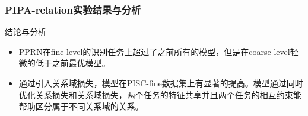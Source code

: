 \documentclass[UTF8]{beamer}
\begin{document}
\begin{frame}
    \frametitle{PIPA-relation实验结果与分析}
        \begin{table}[htpb]
          \centering
          \caption{PIPA-relation实验结果，单位为百分比 (\%) }
          \label{tab:exp-pipa-table}
        \end{table}
        \begin{block}{结论与分析}
            \begin{itemize}
                 \item PPRN在fine-level的识别任务上超过了之前所有的模型，但是在coarse-level轻微的低于之前最优模型。
                 \item 通过引入关系域损失，模型在PISC-fine数据集上有显著的提高。模型通过同时优化关系损失和关系域损失，两个任务的特征共享并且两个任务的相互约束能帮助区分属于不同关系域的关系。
            \end{itemize}
        \end{block}

\end{frame}
\end{document}
